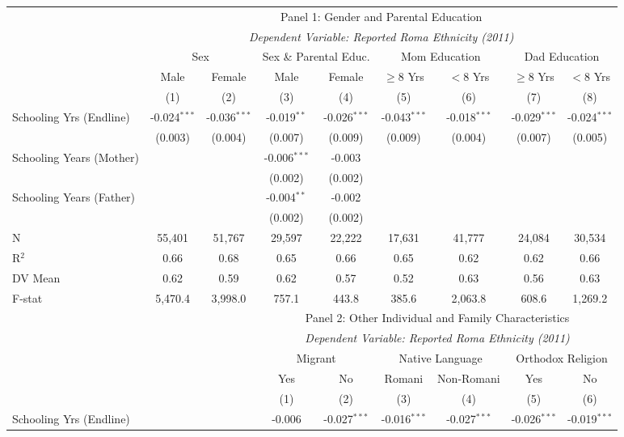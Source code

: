 \begin{tabular}[t]{lcccccccc}
\toprule
& \multicolumn{8}{c}{Panel 1: Gender and Parental Education}\\
& \multicolumn{8}{c}{\textit{Dependent Variable: Reported Roma Ethnicity (2011)}}\\
& \multicolumn{2}{c}{Sex} & \multicolumn{2}{c}{Sex \& Parental Educ.} & \multicolumn{2}{c}{Mom Education} & \multicolumn{2}{c}{Dad Education}\\
& Male & Female & Male & Female & $\geq 8$ Yrs & $<8$ Yrs & $\geq 8$ Yrs & $<8$ Yrs \\
& (1) & (2) & (3) & (4) & (5) & (6) & (7) & (8) \\
\midrule
Schooling Yrs (Endline) & -0.024$^{***}$ & -0.036$^{***}$ & -0.019$^{**}$ & -0.026$^{***}$ & -0.043$^{***}$ & -0.018$^{***}$ & -0.029$^{***}$ & -0.024$^{***}$ \\
& (0.003) & (0.004) & (0.007) & (0.009) & (0.009) & (0.004) & (0.007) & (0.005) \\
Schooling Years (Mother) &  &  & -0.006$^{***}$ & -0.003 &  &  &  &  \\
&  &  & (0.002) & (0.002) &  &  &  &  \\
Schooling Years (Father) &  &  & -0.004$^{**}$ & -0.002 &  &  &  &  \\
&  &  & (0.002) & (0.002) &  &  &  &  \\
\midrule
N & 55,401 & 51,767 & 29,597 & 22,222 & 17,631 & 41,777 & 24,084 & 30,534 \\
R$^2$ & 0.66 & 0.68 & 0.65 & 0.66 & 0.65 & 0.62 & 0.62 & 0.66 \\
DV Mean & 0.62 & 0.59 & 0.62 & 0.57 & 0.52 & 0.63 & 0.56 & 0.63 \\
F-stat & 5,470.4 & 3,998.0 & 757.1 & 443.8 & 385.6 & 2,063.8 & 608.6 & 1,269.2 \\
\midrule
& & & \multicolumn{6}{c}{Panel 2: Other Individual and Family Characteristics}\\
& & & \multicolumn{6}{c}{\textit{Dependent Variable: Reported Roma Ethnicity (2011)}}\\
& & & \multicolumn{2}{c}{Migrant} & \multicolumn{2}{c}{Native Language} & \multicolumn{2}{c}{Orthodox Religion}\\
& & & Yes & No & Romani & Non-Romani & Yes & No \\
& & & (1) & (2) & (3) & (4) & (5) & (6) \\
\midrule
Schooling Yrs (Endline) & & & -0.006 & -0.027$^{***}$ & -0.016$^{***}$ & -0.027$^{***}$ & -0.026$^{***}$ & -0.019$^{***}$ \\

\end{tabular}
